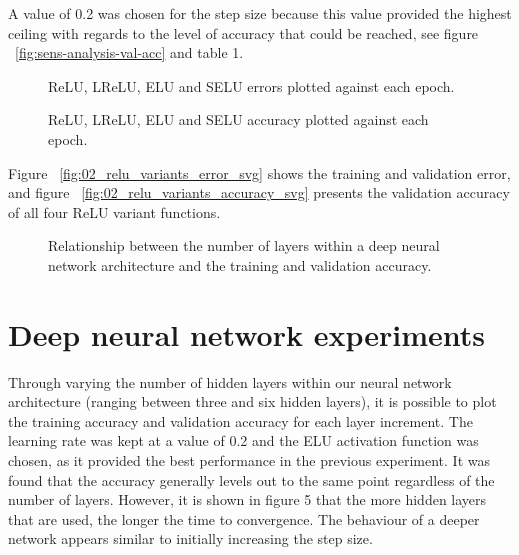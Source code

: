 \documentclass{article}
\begin{document}
A value of 0.2 was chosen for the step size because this value provided the highest ceiling with regards to the level of accuracy that could be reached, see figure ~\ref{fig:sens-analysis-val-acc} and table 1.

\begin{figure}[tb]
\vskip 5mm
\begin{center}
\centerline{}
\caption{ReLU, LReLU, ELU and SELU errors plotted against each epoch.}
\label{fig:relu-variants-error}
\end{center}
\vskip -5mm
\end{figure}

\begin{figure}[tb]
\vskip 5mm
\begin{center}
\centerline{}
\caption{ReLU, LReLU, ELU and SELU accuracy plotted against each epoch.}
\label{fig:relu-variants-accuracy}
\end{center}
\vskip -5mm
\end{figure}

Figure ~\ref{fig:02_relu_variants_error_svg} shows the training and validation error, and figure ~\ref{fig:02_relu_variants_accuracy_svg} presents the validation accuracy of all four ReLU variant functions.

\begin{figure}[tb]
\vskip 5mm
\begin{center}
\centerline{}
\caption{Relationship between the number of layers within a deep neural network architecture and the training and validation accuracy.}
\label{fig:dnn-accuracy}
\end{center}
\vskip -5mm
\end{figure}

\section{Deep neural network experiments}
\label{sec:dnnexpts}

Through varying the number of hidden layers within our neural network architecture (ranging between three and six hidden layers), it is possible to plot the training accuracy and validation accuracy for each layer increment. The learning rate was kept at a value of 0.2 and the ELU activation function was chosen, as it provided the best performance in the previous experiment. It was found that the accuracy generally levels out to the same point regardless of the number of layers. However, it is shown in figure 5 that the more hidden layers that are used, the longer the time to convergence. The behaviour of a deeper network appears similar to initially increasing the step size.
\end{document}
